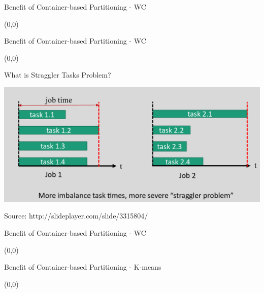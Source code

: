 \documentclass[english]{beamer} %
\begin{document}
\begin{frame}{Benefit of Container-based Partitioning - WC}
\begin{textblock}{1}(0,0)
\end{textblock} 
\end{frame}

\begin{frame}{Benefit of Container-based Partitioning - WC}
\begin{textblock}{1}(0,0)
\end{textblock} 
\end{frame}

\begin{frame}{What is Straggler Tasks Problem?}
\begin{center}
\includegraphics[scale=0.3]{fig/straggler}
\end{center}
\tiny{Source: http://slideplayer.com/slide/3315804/}
\end{frame}

\begin{frame}{Benefit of Container-based Partitioning - WC}
\begin{textblock}{1}(0,0)
\end{textblock} 
\end{frame}

\begin{frame}{Benefit of Container-based Partitioning - K-means}
\begin{textblock}{1}(0,0)
\end{textblock} 
\end{frame}
\end{document}
